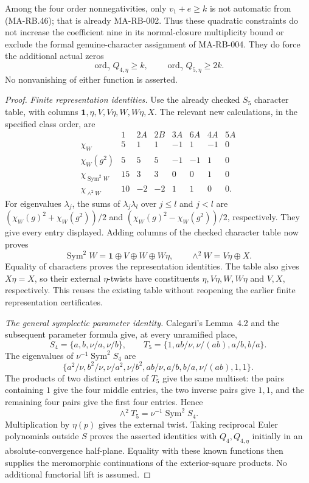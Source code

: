 Among the four order nonnegativities, only \(v_1+e\ge k\)
is not automatic from (MA-RB.46); that is already MA-RB-002.
Thus these quadratic constraints do not increase the
coefficient nine in its normal-closure multiplicity bound
or exclude the formal genuine-character assignment of
MA-RB-004. They do force the additional actual zeros
\[
 \operatorname{ord}_\gamma Q_{4,\eta}\ge k,\qquad
 \operatorname{ord}_\gamma Q_{5,\eta}\ge2k .
 \tag{MA-RB.49}
\]
No nonvanishing of either function is asserted.

\begin{proof}
\emph{Finite representation identities.}
Use the already checked \(S_5\) character table, with columns
\(\mathbf1,\eta,V,V\eta,W,W\eta,X\). The relevant new
calculations, in the specified class order, are
\[
 \begin{array}{c|rrrrrrr}
 &1&2A&2B&3A&6A&4A&5A\\ \hline
 \chi_W&5&1&1&-1&1&-1&0\\
 \chi_W(g^2)&5&5&5&-1&-1&1&0\\
 \chi_{\operatorname{Sym}^2W}&15&3&3&0&0&1&0\\
 \chi_{\wedge^2W}&10&-2&-2&1&1&0&0 .
 \end{array}
 \tag{MA-RB.50}
\]
For eigenvalues \(\lambda_j\), the sums of
\(\lambda_j\lambda_l\) over \(j\le l\) and \(j<l\)
are \((\chi_W(g)^2+\chi_W(g^2))/2\) and
\((\chi_W(g)^2-\chi_W(g^2))/2\), respectively. They
give every entry displayed. Adding columns of the
checked character table now proves
\[
 \operatorname{Sym}^2W
   =\mathbf1\oplus V\oplus W\oplus W\eta,\qquad
 \wedge^2W=V\eta\oplus X .
 \tag{MA-RB.51}
\]
Equality of characters proves the representation identities.
The table also gives \(X\eta=X\), so their external
\(\eta\)-twists have constituents
\(\eta,V\eta,W,W\eta\) and \(V,X\), respectively.
This reuses the existing table without reopening the
earlier finite representation certificates.

\emph{The general symplectic parameter identity.}
Calegari's Lemma~4.2 and the subsequent parameter formula
give, at every unramified place,
\[
 S_4=\{a,b,\nu/a,\nu/b\},\qquad
 T_5=\{1,ab/\nu,\nu/(ab),a/b,b/a\}.
 \tag{MA-RB.52}
\]
The eigenvalues of
\(\nu^{-1}\operatorname{Sym}^2 S_4\) are
\[
 \{a^2/\nu,b^2/\nu,\nu/a^2,\nu/b^2,
                   ab/\nu,a/b,b/a,\nu/(ab),1,1\}.
 \tag{MA-RB.53}
\]
The products of two distinct entries of \(T_5\) give
the same multiset: the pairs containing \(1\) give the
four middle entries, the two inverse pairs give \(1,1\),
and the remaining four pairs give the first four entries.
Hence
\[
                  \wedge^2T_5=\nu^{-1}\operatorname{Sym}^2S_4 .
 \tag{MA-RB.54}
\]
Multiplication by \(\eta(p)\) gives the external twist.
Taking reciprocal Euler polynomials outside \(S\) proves
the asserted identities with \(Q_4,Q_{4,\eta}\) initially
in an absolute-convergence half-plane. Equality with
these known functions then supplies the meromorphic
continuations of the exterior-square products. No
additional functorial lift is assumed.


\end{proof}
